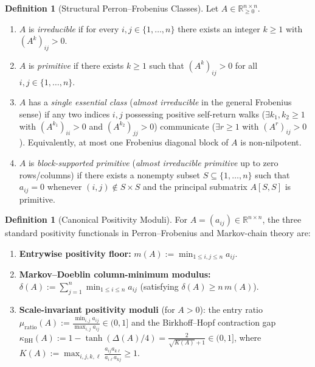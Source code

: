 \documentclass[11pt]{article}
\theoremstyle{definition}
\newtheorem{definition}[theorem]{Definition}
\newcommand{\R}{\mathbb{R}}
\begin{document}
\begin{definition}[Structural Perron--Frobenius Classes]
Let $A \in \R^{n \times n}_{\ge 0}$.
\begin{enumerate}
  \item[(i)] $A$ is \emph{irreducible} if for every $i, j \in \{1, \dots, n\}$ there exists an integer $k \ge 1$ with $(A^k)_{ij} > 0$.
  \item[(ii)] $A$ is \emph{primitive} if there exists $k \ge 1$ such that $(A^k)_{ij} > 0$ for all $i, j \in \{1, \dots, n\}$.
  \item[(iii)] $A$ has a \emph{single essential class} (\emph{almost irreducible} in the general Frobenius sense) if any two indices $i, j$ possessing positive self-return walks ($\exists k_1, k_2 \ge 1$ with $(A^{k_1})_{ii} > 0$ and $(A^{k_2})_{jj} > 0$) communicate ($\exists r \ge 1$ with $(A^r)_{ij} > 0$). Equivalently, at most one Frobenius diagonal block of $A$ is non-nilpotent.
  \item[(iv)] $A$ is \emph{block-supported primitive} (\emph{almost irreducible primitive} up to zero rows/columns) if there exists a nonempty subset $S \subseteq \{1, \dots, n\}$ such that $a_{ij} = 0$ whenever $(i, j) \notin S \times S$ and the principal submatrix $A[S, S]$ is primitive.
\end{enumerate}
\end{definition}

\begin{definition}[Canonical Positivity Moduli]
For $A = (a_{ij}) \in \R^{n \times n}$, the three standard positivity functionals in Perron--Frobenius and Markov-chain theory are:
\begin{enumerate}
  \item[(a)] \textbf{Entrywise positivity floor:} $m(A) := \min_{1 \le i,j \le n} a_{ij}$.
  \item[(b)] \textbf{Markov--Doeblin column-minimum modulus:} $\delta(A) := \sum_{j=1}^n \min_{1 \le i \le n} a_{ij}$ (satisfying $\delta(A) \ge n\,m(A)$).
  \item[(c)] \textbf{Scale-invariant positivity moduli} (for $A > 0$): the entry ratio $\mu_{\mathrm{ratio}}(A) := \frac{\min_{i,j} a_{ij}}{\max_{i,j} a_{ij}} \in (0, 1]$ and the Birkhoff--Hopf contraction gap $\kappa_{\mathrm{BH}}(A) := 1 - \tanh(\Delta(A)/4) = \frac{2}{\sqrt{K(A)} + 1} \in (0, 1]$, where $K(A) := \max_{i,j,k,\ell} \frac{a_{ij} a_{k\ell}}{a_{i\ell} a_{kj}} \ge 1$.
\end{enumerate}
\end{definition}
\end{document}
